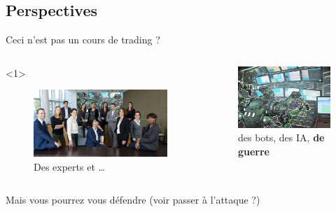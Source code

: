 \documentclass[presentation]{beamer}
\begin{document}
\subsection{Perspectives}
\label{sec:orgcebbb15}
\begin{frame}[label={sec:org525fd72}]{Ceci n'est pas un cours de trading ?}
\begin{columns}
\begin{column}{0.57\columnwidth}
\begin{block}<1>{}
\begin{figure}[htbp]
\centering
\includegraphics[width=\linewidth]{./Pictures/trading_team.png}
\caption{Des experts et \ldots{}}
\end{figure}
\end{block}
\end{column}

\begin{column}{0.42\columnwidth}
\begin{block}{}
\begin{figure}[htbp]
\centering
\includegraphics[width=\linewidth]{./Pictures/pro_bot.jpeg}
\caption{des bots, des IA, \textbf{de guerre}}
\end{figure}
\end{block}
\end{column}
\end{columns}
\end{frame}
\begin{frame}[label={sec:org1b40a03}]{Mais vous pourrez vous défendre (voir passer à l'attaque ?)}
\end{frame}
\end{document}

